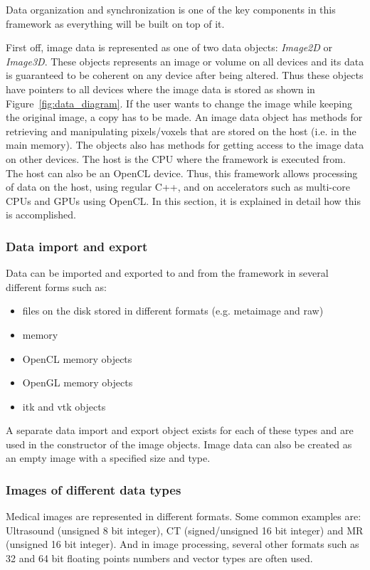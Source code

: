 \documentclass{article}
\begin{document}
Data organization and synchronization is one of the key components in this framework as everything will be built on top of it. 

First off, image data is represented as one of two data objects: \textit{Image2D} or \textit{Image3D}.
These objects represents an image or volume on all devices and its data is guaranteed to be coherent on any device after being altered.
Thus these objects have pointers to all devices where the image data is stored as shown in Figure~\ref{fig:data_diagram}.
If the user wants to change the image while keeping the original image, a copy has to be made.
An image data object has methods for retrieving and manipulating pixels/voxels that are stored on the host (i.e. in the main memory).
The objects also has methods for getting access to the image data on other devices.
The host is the CPU where the framework is executed from.
The host can also be an OpenCL device.
Thus, this framework allows processing of data on the host, using regular C++, and on accelerators such as multi-core CPUs and GPUs using OpenCL.
In this section, it is explained in detail how this is accomplished.

\subsubsection{Data import and export}

Data can be imported and exported to and from the framework in several different forms such as:
\begin{itemize}
    \itemsep 1pt
    \item files on the disk stored in different formats (e.g. metaimage and raw)
    \item memory
    \item OpenCL memory objects
    \item OpenGL memory objects
    \item itk and vtk objects
\end{itemize}
A separate data import and export object exists for each of these types and are used in the constructor of the image objects.
Image data can also be created as an empty image with a specified size and type.

\subsubsection{Images of different data types}

Medical images are represented in different formats.
Some common examples are: Ultrasound (unsigned 8 bit integer), CT (signed/unsigned 16 bit integer) and MR (unsigned 16 bit integer).
And in image processing, several other formats such as 32 and 64 bit floating points numbers and vector types are often used.
\end{document}

